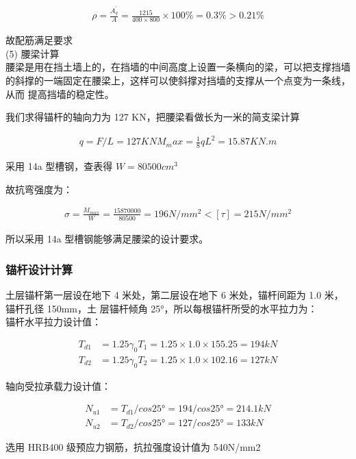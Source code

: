 \begin{align}
\label{fx:6.X}
\rho =\frac{A^{'}_q}{A}=\frac{1215}{400\times800}\times 100\% =0.3\% > 0.21\% 
\end{align}

故配筋满足要求\\

(5) 腰梁计算\\

腰梁是用在挡土墙上的，在挡墙的中间高度上设置一条横向的梁，可以把支撑挡墙
的斜撑的一端固定在腰梁上，这样可以使斜撑对挡墙的支撑从一个点变为一条线，从而
提高挡墙的稳定性。

我们求得锚杆的轴向力为 127 KN，把腰梁看做长为一米的简支梁计算

\begin{align*}
q=F/L=127KN
M_max=\frac{1}{8}qL^2=15.87KN.m
\end{align*}

采用 14a 型槽钢，查表得 $W=80500cm^3$

故抗弯强度为：

\begin{align}
    \sigma =\frac{M_{max}}{W}=\frac{15870000}{80500}=196 N/mm^2 < [\tau]=215 N/mm^2
\end{align}

所以采用 14a 型槽钢能够满足腰梁的设计要求。\\

\subsubsection{锚杆设计计算}

土层锚杆第一层设在地下 4 米处，第二层设在地下 6 米处，锚杆间距为 1.0 米，锚杆孔径 150mm，土
层锚杆倾角 25°，所以每根锚杆所受的水平拉力为：\\

锚杆水平拉力设计值：

\begin{align}
 T_{d1}&=1.25\gamma_0T_1=1.25×1.0×155.25=194kN\\
 T_{d2}&=1.25\gamma_0T_2=1.25×1.0×102.16=127kN
\end{align}

轴向受拉承载力设计值： 

\begin{align}
N_{u1}&=T_{d1}/cos25°=194/cos25°=214.1kN\\
N_{u2}&=T_{d2}/cos25°=127/cos25°=133kN
\end{align}

选用 HRB400 级预应力钢筋，抗拉强度设计值为 540N/mm2

